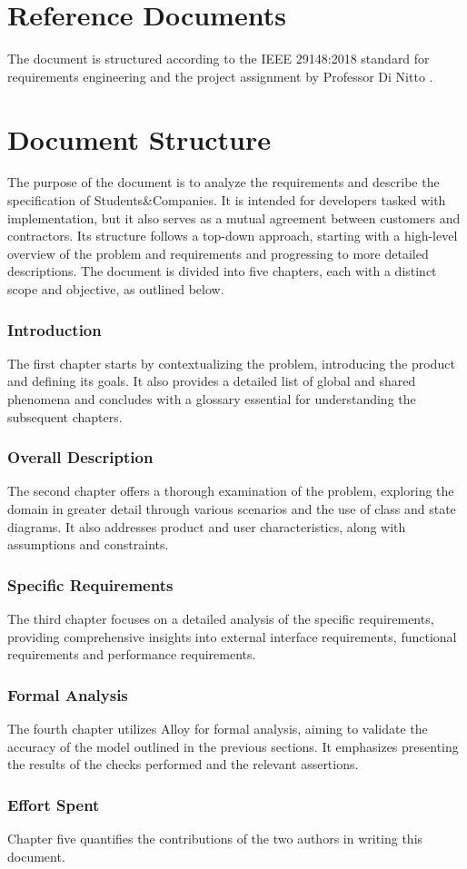 \section{Reference Documents}
The document is structured according to the IEEE 29148:2018 standard for requirements engineering \cite{ieee2018} and the project assignment by Professor Di Nitto \cite{project2024}.

\section{Document Structure}
The purpose of the document is to analyze the requirements and describe the specification of Students\&Companies.
It is intended for developers tasked with implementation, but it also serves as a mutual agreement between customers and contractors.
Its structure follows a top-down approach, starting with a high-level overview of the problem and requirements and progressing to more detailed descriptions.
The document is divided into five chapters, each with a distinct scope and objective, as outlined below.

\subsubsection{Introduction}
The first chapter starts by contextualizing the problem, introducing the product and defining its goals.
It also provides a detailed list of global and shared phenomena and concludes with a glossary essential for understanding the subsequent chapters.

\subsubsection{Overall Description}
The second chapter offers a thorough examination of the problem, exploring the domain in greater detail through various scenarios and the use of class and state diagrams.
It also addresses product and user characteristics, along with assumptions and constraints.

\subsubsection{Specific Requirements}
The third chapter focuses on a detailed analysis of the specific requirements, providing comprehensive insights into external interface requirements, functional requirements and performance requirements.

\subsubsection{Formal Analysis}
The fourth chapter utilizes Alloy for formal analysis, aiming to validate the accuracy of the model outlined in the previous sections.
It emphasizes presenting the results of the checks performed and the relevant assertions.

\subsubsection{Effort Spent}
Chapter five quantifies the contributions of the two authors in writing this document.
